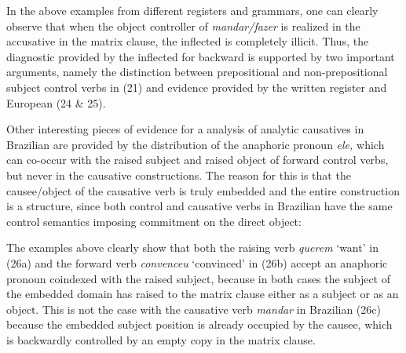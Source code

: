 \documentclass[output=paper]{langsci/langscibook}
\begin{document}
In the above examples from different registers and grammars, one can clearly observe that when the object controller of \textit{mandar\slash fazer}\textbf{ }is realized in the accusative in the matrix clause, the inflected  is completely illicit. Thus, the diagnostic provided by the inflected  for backward  is supported by two important arguments, namely the distinction between prepositional and non{}-prepositional subject control verbs in (21) and evidence provided by the written register and European  (24 \& 25).

Other interesting pieces of evidence for a  analysis of analytic causatives in Brazilian  are provided by the distribution of the anaphoric pronoun \textit{ele,} which can co-occur with the raised subject and raised object of forward control verbs, but never in the causative constructions. The reason for this is that the causee\slash object of the causative verb is truly embedded and the entire construction is a  structure, since both control and causative verbs in Brazilian  have the same control semantics imposing commitment on the direct object:

\ea%
    \label{ex:moreno:26}
    \z
\z
    
The examples above clearly show that both the raising verb \textit{querem} ‘want’ in (26a) and the forward  verb \textit{convenceu} ‘convinced’ in (26b) accept an anaphoric pronoun coindexed with the raised subject, because in both cases the subject of the embedded domain has raised to the matrix clause either as a subject or as an object. This is not the case with the causative verb \textit{mandar} in Brazilian  (26c) because the embedded subject position is already occupied by the causee, which is backwardly controlled by an empty copy in the matrix clause. 
\end{document}
